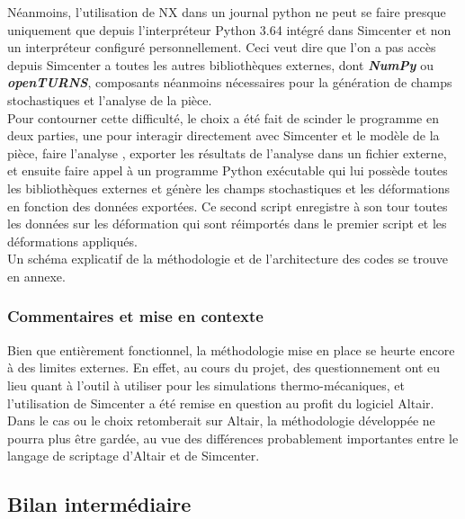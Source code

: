 \documentclass[a4paper,10pt]{article}
\begin{document}
Néanmoins, l'utilisation de NX dans un journal python ne peut se faire presque uniquement que depuis l’interpréteur Python 3.64 intégré dans Simcenter et non un interpréteur configuré personnellement. Ceci veut dire que l'on a pas accès depuis Simcenter a toutes les autres bibliothèques externes, dont \textit{\textbf{NumPy}} ou \textit{\textbf{openTURNS}}, composants néanmoins nécessaires pour la génération de champs stochastiques et l'analyse de la pièce. \\

Pour contourner cette difficulté, le choix a été fait de scinder le programme en deux parties, une pour interagir directement avec Simcenter et le modèle de la pièce, faire l'analyse , exporter les résultats de l'analyse dans un fichier externe, et ensuite faire appel à un programme Python exécutable qui lui possède toutes les bibliothèques externes et génère les champs stochastiques et les déformations en fonction des données exportées. Ce second script enregistre à son tour toutes les données sur les déformation qui sont réimportés dans le premier script et les déformations appliqués. \\

Un schéma explicatif de la méthodologie et de l'architecture des codes se trouve en annexe. \\

\subsubsection{Commentaires et mise en contexte}

Bien que entièrement fonctionnel, la méthodologie mise en place se heurte encore à des limites externes. En effet, au cours du projet, des questionnement ont eu lieu quant à l'outil à utiliser pour les simulations thermo-mécaniques, et l'utilisation de Simcenter a été remise en question au profit du logiciel Altair.\\ 
Dans le cas ou le choix retomberait sur Altair, la méthodologie développée ne pourra plus être gardée, au vue des différences probablement importantes entre le langage de scriptage d'Altair et de Simcenter.\\ 
 
\subsection{Bilan intermédiaire}
\end{document}
